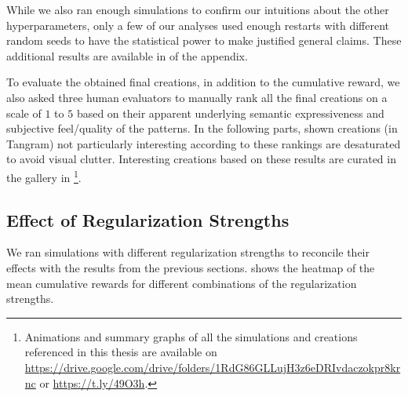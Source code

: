 While we also ran enough simulations to confirm our intuitions about the other hyperparameters, only a few of our analyses used enough restarts with different random seeds to have the statistical power to make justified general claims.
These additional results are available in  of the appendix.

To evaluate the obtained final creations, in addition to the cumulative reward, we also asked three human evaluators to manually rank all the final creations on a scale of \(1\) to \(5\) based on their apparent underlying semantic expressiveness and subjective feel/quality of the patterns.
In the following parts, shown creations (in Tangram) not particularly interesting according to these rankings are desaturated to avoid visual clutter.
Interesting creations based on these results are curated in the gallery in \footnote[1]{Animations and summary graphs of all the simulations and creations referenced in this thesis are available on \url{https://drive.google.com/drive/folders/1RdG86GLLujH3z6eDRIvdaczokpr8krnc} or \url{https://t.ly/49O3h}.}.




\subsection{Effect of Regularization Strengths}
\label{sec:alpha-beta-semantics}
We ran simulations with different regularization strengths to reconcile their effects with the results from the previous sections.
 shows the heatmap of the mean cumulative rewards for different combinations of the regularization strengths.

